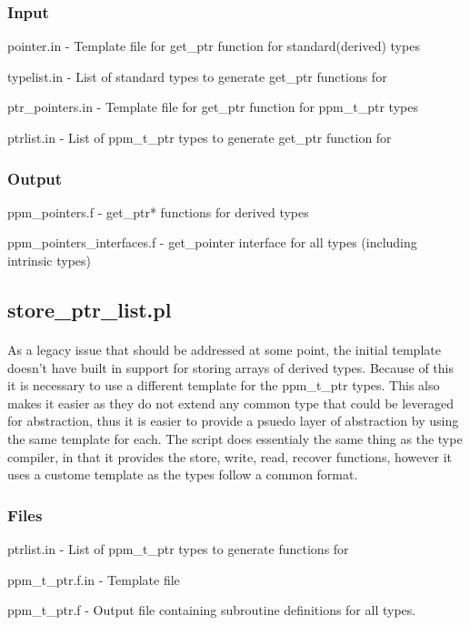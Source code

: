 \documentclass{article}
\begin{document}
\subsubsection{Input}
\begin{list}{}{}
\item pointer.in - Template file for get\_ptr function for standard(derived) types
\item typelist.in - List of standard types to generate get\_ptr functions for
\item ptr\_pointers.in - Template file for get\_ptr function for ppm\_t\_ptr types
\item ptrlist.in - List of ppm\_t\_ptr types to generate get\_ptr function for
\end{list}
\subsubsection{Output}
\begin{list}{}{}
\item ppm\_pointers.f - get\_ptr* functions for derived types
\item ppm\_pointers\_interfaces.f - get\_pointer interface for all types (including intrinsic types)
\end{list}

\subsection{store\_ptr\_list.pl}
\paragraph{}
As a legacy issue that should be addressed at some point, the initial template doesn't have built in support for storing arrays of derived types. Because of this it is necessary to use a different template for the ppm\_t\_ptr types. This also makes it easier as they do not extend any common type that could be leveraged for abstraction, thus it is easier to provide a psuedo layer of abstraction by using the same template for each. The script does essentialy the same thing as the type compiler, in that it provides the store, write, read, recover functions, however it uses a custome template as the types follow a common format.
\subsubsection{Files}
\begin{list}{}{}
\item ptrlist.in - List of ppm\_t\_ptr types to generate functions for
\item ppm\_t\_ptr.f.in - Template file
\item ppm\_t\_ptr.f - Output file containing subroutine definitions for all types.
\end{list}
\end{document}
